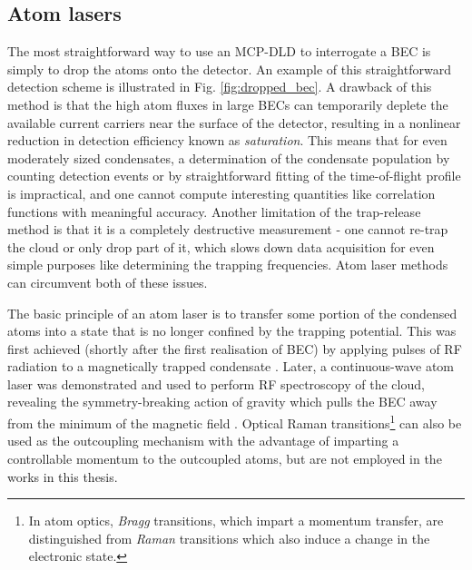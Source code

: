 \subsection*{Atom lasers}
	\label{sec:atomlaser}



	The most straightforward way to use an MCP-DLD to interrogate a BEC is simply to drop the atoms onto the detector.
	An example of this straightforward detection scheme is illustrated in Fig.
	\ref{fig:dropped_bec}.
	A drawback of this method is that the high atom fluxes in large BECs can temporarily deplete the available current carriers near the surface of the detector, resulting in a nonlinear reduction in detection efficiency known as \emph{saturation}.
	This means that for even moderately sized condensates, a determination of the condensate population by counting detection events or by straightforward fitting of the time-of-flight profile is impractical, and one cannot compute interesting quantities like correlation functions with meaningful accuracy.
	Another limitation of the trap-release method is that it is a completely destructive measurement - one cannot re-trap the cloud or only drop part of it, which slows down data acquisition for even simple purposes like determining the trapping frequencies.
	Atom laser methods can circumvent both of these issues.
	

	The basic principle of an atom laser is to transfer some portion of the condensed atoms into a state that is no longer confined by the trapping potential.
	This was first achieved (shortly after the first realisation of BEC) by applying pulses of RF radiation to a magnetically trapped condensate \cite{Mewes97}.
	Later, a continuous-wave atom laser was demonstrated and used to perform RF spectroscopy of the cloud, revealing the symmetry-breaking action of gravity which pulls the BEC away from the minimum of the magnetic field \cite{Bloch99}.
	Optical Raman transitions\footnote{In atom optics, \emph{Bragg} transitions, which impart a momentum transfer, are distinguished from  \emph{Raman} transitions which also induce a change in the electronic state.} can also be used as the outcoupling mechanism \cite{Hagley99} with the advantage of imparting a controllable momentum to the outcoupled atoms, but are not employed in the works in this thesis.
	


